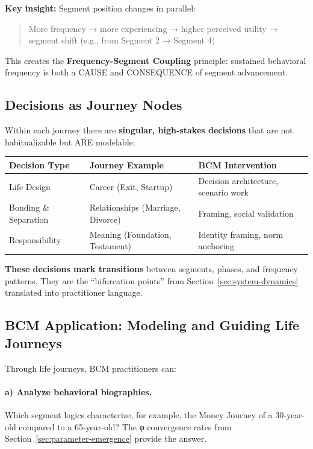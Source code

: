 {{{\textbf{Key insight:} Segment position changes in parallel:

\begin{quote}
More frequency → more experiencing → higher perceived utility → segment shift (e.g., from Segment 2 → Segment 4)
\end{quote}

This creates the \textbf{Frequency-Segment Coupling} principle: sustained behavioral frequency is both a CAUSE and CONSEQUENCE of segment advancement.

\subsection{Decisions as Journey Nodes}

Within each journey there are \textbf{singular, high-stakes decisions} that are not habitualizable but ARE modelable:

\begin{center}
\small
\begin{tabular}{@{}lll@{}}
\toprule
\textbf{Decision Type} & \textbf{Journey Example} & \textbf{BCM Intervention} \\
\midrule
Life Design & Career (Exit, Startup) & Decision architecture, scenario work \\
Bonding \& Separation & Relationships (Marriage, Divorce) & Framing, social validation \\
Responsibility & Meaning (Foundation, Testament) & Identity framing, norm anchoring \\
\bottomrule
\end{tabular}
\end{center}

\textbf{These decisions mark transitions} between segments, phases, and frequency patterns. They are the ``bifurcation points'' from Section~\ref{sec:system-dynamics} translated into practitioner language.

\subsection{BCM Application: Modeling and Guiding Life Journeys}

Through life journeys, BCM practitioners can:

\paragraph{a) Analyze behavioral biographies.}
Which segment logics characterize, for example, the Money Journey of a 30-year-old compared to a 65-year-old? The φ convergence rates from Section~\ref{sec:parameter-emergence} provide the answer.

}}}
